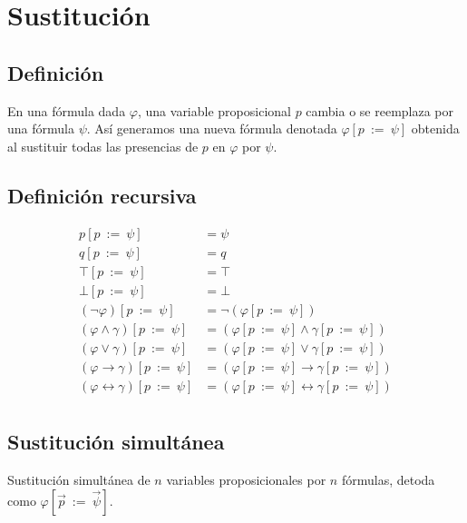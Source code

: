 \documentclass[a4paper]{article}
\begin{document}
\section{Sustitución}
\subsection{Definición}
\noindent
En una fórmula dada \(\varphi\), una variable proposicional \(p\) cambia o se reemplaza por una
fórmula \(\psi\). Así generamos una nueva fórmula denotada \(\varphi \left[p \ := \ \psi\right]\)
obtenida al sustituir todas las presencias de \(p\) en \(\varphi\) por \(\psi\).
\newpage
\subsection{Definición recursiva}
\begin{align*}
    p\left[p \ := \ \psi \right] &= \psi \\
    q\left[p \ := \ \psi \right] &= q \\
    \top\left[p \ := \ \psi \right] &= \top \\
    \bot\left[p \ := \ \psi \right] &= \bot \\
    \left(\neg \varphi\right)\left[p \ := \ \psi \right] &= \neg \left(\varphi\left[p \ := \ \psi \right]\right) \\
    \left(\varphi \land \gamma \right)\left[p \ := \ \psi \right] &= \left(\varphi\left[p \ := \ \psi \right] \land \gamma\left[p \ := \ \psi \right]\right) \\
    \left(\varphi \lor \gamma \right)\left[p \ := \ \psi \right] &= \left(\varphi\left[p \ := \ \psi \right] \lor \gamma\left[p \ := \ \psi \right]\right) \\
    \left(\varphi \rightarrow \gamma \right)\left[p \ := \ \psi \right] &= \left(\varphi\left[p \ := \ \psi \right] \rightarrow \gamma\left[p \ := \ \psi \right]\right) \\
    \left(\varphi \leftrightarrow \gamma \right)\left[p \ := \ \psi \right] &= \left(\varphi\left[p \ := \ \psi \right] \leftrightarrow \gamma\left[p \ := \ \psi \right]\right) \\
\end{align*}
\subsection{Sustitución simultánea}
\noindent
Sustitución simultánea de \(n\) variables proposicionales por \(n\) fórmulas, detoda como 
\(\varphi\left[\vec{p} \ := \ \vec{\psi}\right]\).
\end{document}
